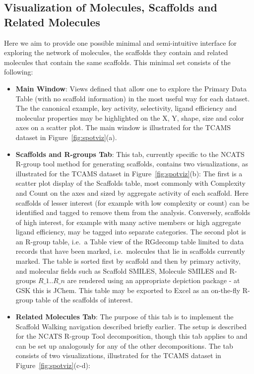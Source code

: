 \documentclass[journal=jacsat,manuscript=article]{achemso}
\newcommand*\fref[1]{Figure~\ref{fig:#1}}
\newcommand*\ie{i.e.~}
\begin{document}
\subsection{Visualization of Molecules, Scaffolds and Related Molecules}

Here we aim to provide one possible minimal and semi-intuitive interface for exploring the network of molecules, the scaffolds they contain and related molecules that contain the same scaffolds. This minimal set consists of the following:
\begin{itemize}
\item {\bf Main Window}: Views defined that allow one to explore the Primary Data Table (with no scaffold information) in the most useful way for each dataset.  The the canonical example, key activity, selectivity, ligand efficiency and molecular properties may be highlighted on the X, Y, shape, size and color axes on a scatter plot. The main window is illustrated for the TCAMS dataset in \fref{spotviz}(a).
\item {\bf Scaffolds and R-groups Tab}: This tab, currently specific to the NCATS R-group tool method for generating scaffolds, contains two visualizations, as illustrated for the TCAMS dataset in \fref{spotviz}(b):  
\subitem The first is a scatter plot display of the Scaffolds table, most commonly with Complexity and Count on the axes and sized by aggregate activity of each scaffold.  Here scaffolds of lesser interest (for example with low complexity or count) can be identified and tagged to remove them from the analysis. Conversely, scaffolds of high interest, for example with many active members or high aggregate ligand efficiency, may be tagged into separate categories.
\subitem The second plot is an R-group table, \ie a Table view of the {RG}decomp table limited to data records that have been marked, \ie molecules that lie in scaffolds currently marked. The table is sorted first by scaffold and then by primary activity, and molecular fields such as Scaffold SMILES, Molecule SMILES and R-groups $R\_1..R\_n$ are rendered using an appropriate depiction package - at GSK this is {JChem}.  This table may be exported to Excel as an on-the-fly R-group table of the scaffolds of interest.
\item {\bf Related Molecules Tab}: The purpose of this tab is to implement the Scaffold Walking navigation described briefly earlier.  The setup is described for the NCATS R-group Tool decomposition, though this tab applies to and can be set up analogously for any of the other decompositions. The tab consists of two visualizations, illustrated for the TCAMS dataset in \fref{spotviz}(c-d):

\end{itemize}
\end{document}
